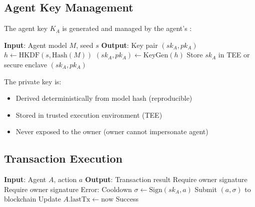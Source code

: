 \subsection{Agent Key Management}

The agent key $K_A$ is generated and managed by the agent's \LLM{}:

\begin{algorithm}[t]
\caption{Agent Key Generation}
\label{alg:keygen}
\begin{algorithmic}[1]
\STATE \textbf{Input}: Agent model $M$, seed $s$
\STATE \textbf{Output}: Key pair $(sk_A, pk_A)$
\STATE $h \leftarrow \text{HKDF}(s, \text{Hash}(M))$
\STATE $(sk_A, pk_A) \leftarrow \text{KeyGen}(h)$
\STATE Store $sk_A$ in TEE or secure enclave
\RETURN $(sk_A, pk_A)$
\end{algorithmic}
\end{algorithm}

The private key is:
\begin{itemize}
    \item Derived deterministically from model hash (reproducible)
    \item Stored in trusted execution environment (TEE)
    \item Never exposed to the owner (owner cannot impersonate agent)
\end{itemize}

\subsection{Transaction Execution}

\begin{algorithm}[t]
\caption{Agent Transaction Execution}
\label{alg:tx}
\begin{algorithmic}[1]
\STATE \textbf{Input}: Agent $A$, action $a$
\STATE \textbf{Output}: Transaction result
\STATE {}
    \STATE Require owner signature
\ENDIF
{}
    \STATE Require owner signature
\ENDIF
\STATE {}
    \RETURN Error: Cooldown
\ENDIF
\STATE {}
\STATE $\sigma \leftarrow \text{Sign}(sk_A, a)$
\STATE Submit $(a, \sigma)$ to blockchain
\STATE Update $A.\text{lastTx} \leftarrow \text{now}$
\RETURN Success
\end{algorithmic}
\end{algorithm}


